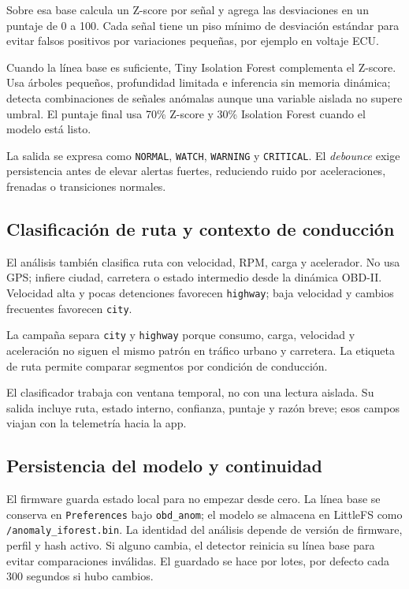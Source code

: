 \documentclass[12pt,letterpaper]{report}
\begin{document}
Sobre esa base calcula un Z-score por señal y agrega las desviaciones en un puntaje de 0 a 100. Cada señal tiene un piso mínimo de desviación estándar para evitar falsos positivos por variaciones pequeñas, por ejemplo en voltaje ECU.

Cuando la línea base es suficiente, Tiny Isolation Forest complementa el Z-score. Usa árboles pequeños, profundidad limitada e inferencia sin memoria dinámica; detecta combinaciones de señales anómalas aunque una variable aislada no supere umbral. El puntaje final usa 70\% Z-score y 30\% Isolation Forest cuando el modelo está listo.

La salida se expresa como \texttt{NORMAL}, \texttt{WATCH}, \texttt{WARNING} y \texttt{CRITICAL}. El \emph{debounce} exige persistencia antes de elevar alertas fuertes, reduciendo ruido por aceleraciones, frenadas o transiciones normales.

\subsection{Clasificación de ruta y contexto de conducción}

El análisis también clasifica ruta con velocidad, RPM, carga y acelerador. No usa GPS; infiere ciudad, carretera o estado intermedio desde la dinámica OBD-II. Velocidad alta y pocas detenciones favorecen \texttt{highway}; baja velocidad y cambios frecuentes favorecen \texttt{city}.

La campaña separa \texttt{city} y \texttt{highway} porque consumo, carga, velocidad y aceleración no siguen el mismo patrón en tráfico urbano y carretera. La etiqueta de ruta permite comparar segmentos por condición de conducción.

El clasificador trabaja con ventana temporal, no con una lectura aislada. Su salida incluye ruta, estado interno, confianza, puntaje y razón breve; esos campos viajan con la telemetría hacia la app.

\subsection{Persistencia del modelo y continuidad}

El firmware guarda estado local para no empezar desde cero. La línea base se conserva en \texttt{Preferences} bajo \texttt{obd\_anom}; el modelo se almacena en LittleFS como \texttt{/anomaly\_iforest.bin}. La identidad del análisis depende de versión de firmware, perfil y hash activo. Si alguno cambia, el detector reinicia su línea base para evitar comparaciones inválidas. El guardado se hace por lotes, por defecto cada 300 segundos si hubo cambios.
\end{document}
